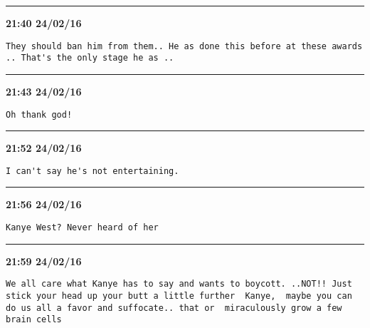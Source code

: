 \hrule%

\begin{adjustwidth}{0cm}{0cm}
\footnotesize \textbf{21:40 24/02/16}

\begin{lstlisting}[breaklines, breakatwhitespace, basicstyle=\small, frame=leftline]
They should ban him from them.. He as done this before at these awards .. That's the only stage he as ..
\end{lstlisting}
\end{adjustwidth}

\hrule%

\begin{adjustwidth}{0cm}{0cm}
\footnotesize \textbf{21:43 24/02/16}

\begin{lstlisting}[breaklines, breakatwhitespace, basicstyle=\small, frame=leftline]
Oh thank god!
\end{lstlisting}
\end{adjustwidth}

\hrule%

\begin{adjustwidth}{0cm}{0cm}
\footnotesize \textbf{21:52 24/02/16}

\begin{lstlisting}[breaklines, breakatwhitespace, basicstyle=\small, frame=leftline]
I can't say he's not entertaining.
\end{lstlisting}
\end{adjustwidth}

\hrule%

\begin{adjustwidth}{0cm}{0cm}
\footnotesize \textbf{21:56 24/02/16}

\begin{lstlisting}[breaklines, breakatwhitespace, basicstyle=\small, frame=leftline]
Kanye West? Never heard of her
\end{lstlisting}
\end{adjustwidth}

\hrule%

\begin{adjustwidth}{0cm}{0cm}
\footnotesize \textbf{21:59 24/02/16}

\begin{lstlisting}[breaklines, breakatwhitespace, basicstyle=\small, frame=leftline]
We all care what Kanye has to say and wants to boycott. ..NOT!! Just stick your head up your butt a little further  Kanye,  maybe you can do us all a favor and suffocate.. that or  miraculously grow a few brain cells
\end{lstlisting}
\end{adjustwidth}


